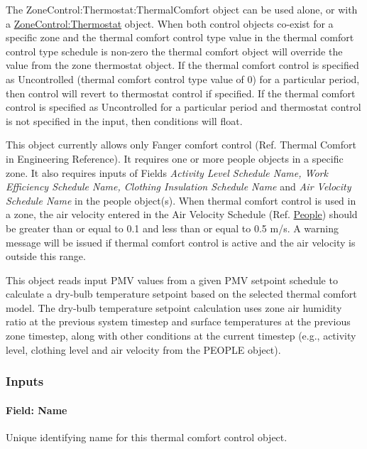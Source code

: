 The ZoneControl:Thermostat:ThermalComfort object can be used alone, or with a \hyperref[zonecontrolthermostat]{ZoneControl:Thermostat} object. When both control objects co-exist for a specific zone and the thermal comfort control type value in the thermal comfort control type schedule is non-zero the thermal comfort object will override the value from the zone thermostat object. If the thermal comfort control is specified as Uncontrolled (thermal comfort control type value of 0) for a particular period, then control will revert to thermostat control if specified. If the thermal comfort control is specified as Uncontrolled for a particular period and thermostat control is not specified in the input, then conditions will float.

This object currently allows only Fanger comfort control (Ref. Thermal Comfort in Engineering Reference). It requires one or more people objects in a specific zone. It also requires inputs of Fields \emph{Activity Level Schedule Name, Work Efficiency Schedule Name, Clothing Insulation Schedule Name} and \emph{Air Velocity Schedule Name} in the people object(s). When thermal comfort control is used in a zone, the air velocity entered in the Air Velocity Schedule (Ref. \hyperref[people]{People}) should be greater than or equal to 0.1 and less than or equal to 0.5 m/s. A warning message will be issued if thermal comfort control is active and the air velocity is outside this range.

This object reads input PMV values from a given PMV setpoint schedule to calculate a dry-bulb temperature setpoint based on the selected thermal comfort model. The dry-bulb temperature setpoint calculation uses zone air humidity ratio at the previous system timestep and surface temperatures at the previous zone timestep, along with other conditions at the current timestep (e.g., activity level, clothing level and air velocity from the PEOPLE object).

\subsubsection{Inputs}\label{inputs-9-025}

\paragraph{Field: Name}\label{field-name-7-024}

Unique identifying name for this thermal comfort control object.

